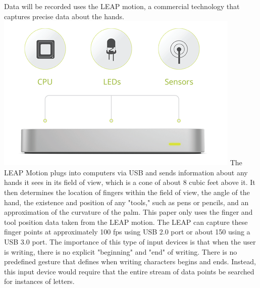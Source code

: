 Data will be recorded uses the LEAP motion, a commercial technology that captures precise data about the hands.
\includegraphics[width=\columnwidth]{images/leap.jpg}
The LEAP Motion plugs into computers via USB and sends information about any hands it sees in its field of view, which is a cone of about 8 cubic feet above it.
It then determines the location of fingers within the field of view, the angle of the hand, the existence and position of any "tools," such as pens or pencils, and an approximation of the curvature of the palm.
This paper only uses the finger  and tool position data taken from the LEAP motion. The LEAP can capture these finger points at approximately 100 fps using USB 2.0 port or about 150 using a USB 3.0 port.
The importance of this type of input devices is that when the user is writing, there is no explicit "beginning" and "end" of writing. There is no predefined gesture that defines when writing characters begins and ends. Instead, this input device would require that the entire stream of data points be searched for instances of letters. 
